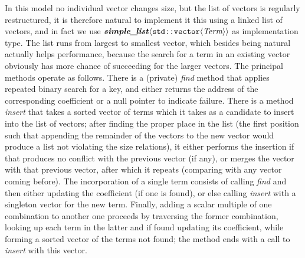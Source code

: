 \documentclass[12pt]{article}
\theoremstyle{plain}
\theoremstyle{definition}
\newcommand\std[1]{\texttt{std::#1}}
\def\vect.{\std{vector}}
\def\smpl.{\textbf{\textit{simple\_\!list}}}
\def\ang#1{\langle#1\rangle}
\begin{document}
In this model no individual vector changes size, but the list of vectors is
regularly restructured, it is therefore natural to implement it this using a
linked list of vectors, and in fact we use
$\smpl.\ang{\vect.\ang{\textit{Term}}}$ as implementation type. The list runs
from largest to smallest vector, which besides being natural actually helps
performance, because the search for a term in an existing vector obviously has
more chance of succeeding for the larger vectors. The principal methods operate
as follows. There is a (private) \textit{find} method that applies repeated
binary search for a key, and either returns the address of the corresponding
coefficient or a null pointer to indicate failure. There is a method
\textit{insert} that takes a sorted vector of terms which it takes as a
candidate to insert into the list of vectors; after finding the proper place in
the list (the first position such that appending the remainder of the vectors to
the new vector would produce a list not violating the size relations), it either
performs the insertion if that produces no conflict with the previous vector (if
any), or merges the vector with that previous vector, after which it repeats
(comparing with any vector coming before). The incorporation of a single term
consists of calling \textit{find} and then either updating the coefficient (if
one is found), or else calling \textit{insert} with a singleton vector for the
new term. Finally, adding a scalar multiple of one combination to another one
proceeds by traversing the former combination, looking up each term in the
latter and if found updating its coefficient, while forming a sorted vector of
the terms not found; the method ends with a call to \textit{insert} with this
vector.
\end{document}
